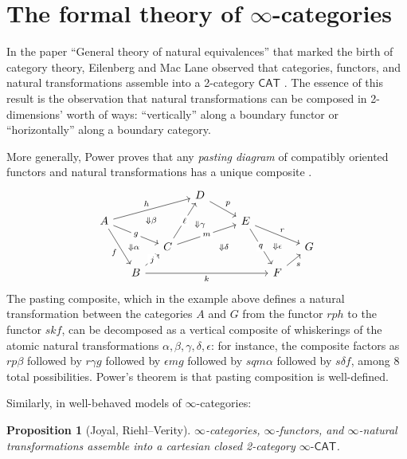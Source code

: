 \documentclass[11pt]{ctexart}
\newtheorem{prop}[thm]{Proposition}
\theoremstyle{definition}
\theoremstyle{remark}
\numberwithin{equation}{section}
\newcommand{\CAT}{\mathsf{CAT}}
\newcommand{\ooCAT}{\infty\text{-}\mathsf{CAT}}
\newcommand{\1}{\mathbbe{1}}
\newcommand{\2}{\mathbbe{2}}
\newcommand{\3}{\mathbbe{3}}
\begin{document}
\section{The formal theory of \texorpdfstring{$\infty$}{infinity}-categories}\label{sec:formal}

In the paper ``General theory of natural equivalences'' that marked the birth of category theory, Eilenberg and Mac Lane observed that categories, functors, and natural transformations assemble into a 2-category $\CAT$ \cite{EM}.    
 The essence of this result is the observation that natural transformations can be composed in 2-dimensions' worth of ways: ``vertically'' along a boundary functor or ``horizontally'' along a boundary category. 

More generally, Power proves that any \emph{pasting diagram} of compatibly oriented functors and natural transformations has a unique composite \cite{Power}. 
\[
\begin{tikzcd}[sep=small] & \arrow[ddr, phantom, "\scriptstyle\Downarrow\beta"]  & & D \arrow[drr, "p"] \\
A \arrow[ddr, "f"'] \arrow[drr, "g" description] \arrow[urrr, "h"] & & & & &  E \arrow[drr, "r"] \arrow[ddr, "q" description] & \arrow[dd, phantom, "\scriptstyle\Downarrow\epsilon"]  \\ \arrow[rr, phantom, "\scriptstyle\Downarrow\alpha"] 
& & C \arrow[uur, "\ell" description] \arrow[urrr, "m" description] \arrow[rrrr, phantom, "\scriptstyle\Downarrow\delta"] & \arrow[uu, phantom, "\scriptstyle\Downarrow\gamma"]   & &~ & ~ & G \\ & B \arrow[ur, "j" description] \arrow[rrrrr, "k"']  & & & & &  F \arrow[ur, "s"']
\end{tikzcd}
\]
The pasting composite, which in the example above defines a natural transformation between the categories $A$ and $G$ from the functor $rph$ to the functor $skf$, can be decomposed as a vertical composite of whiskerings of the atomic natural transformations $\alpha, \beta, \gamma,\delta,\epsilon$: for instance, the composite factors as $rp\beta$ followed by $r\gamma g$ followed by $\epsilon mg$ followed by $sqm\alpha$ followed by $s\delta f$, among 8 total possibilities. Power's theorem is that pasting composition is well-defined.

Similarly, in well-behaved models of $\infty$-categories:

\begin{prop}[Joyal, Riehl--Verity] $\infty$-categories, $\infty$-functors, and $\infty$-natural transformations assemble into a cartesian closed 2-category $\ooCAT$.
\end{prop}
\end{document}
